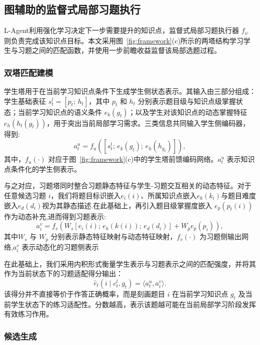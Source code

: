 \documentclass[11pt,a4paper]{article}
\begin{document}
\subsection{图辅助的监督式局部习题执行}
L-Agent利用强化学习决定下一步需要提升的知识点，监督式局部习题执行器 $f_\psi$ 则负责完成该知识点目标。本文采用图~\ref{fig:framework}(c)所示的两塔结构学习学生与习题之间的匹配函数，并使用一步前瞻收益监督该局部选题过程。

\subsubsection{双塔匹配建模}

学生塔用于在当前学习知识点条件下生成学生侧状态表示。其输入由三部分组成：学生基础表征 $s_t^l=[p_t;\,h_t]$，其中 $p_t$ 和 $h_t$ 分别表示题目级与知识点级掌握状态；当前学习知识点的语义条件 $e_k(g_t)$；以及学生对该知识点的动态掌握特征 $e_h(h_t(g_t))$，用于突出当前局部学习需求。三类信息共同输入学生侧编码器，得到:
\begin{equation}
a_t^{u}
=
f_u\!\left([s_t^l;\,e_k(g_t);\,
e_h(h_{g_t})]\right),
\end{equation}
其中，$f_u(\cdot)$ 对应于图~\ref{fig:framework}(c)中的学生塔前馈编码网络。$a_t^u$ 表示知识点条件化的学生侧表示。

与之对应，习题塔同时整合习题静态特征与学生-习题交互相关的动态特征。对于任意候选习题 $i$，我们将题目标识嵌入$e_i(i)$、所属知识点嵌入$e_k(k_i)$与题目难度嵌入$e_d(d_i)$视为其静态描述.在此基础上，再引入题目级掌握度嵌入 $e_p(p_t(i))$ 作为动态补充,进而得到习题表示:
\begin{equation}
a_i^{v}
=
f_v\!\left(
W_s[e_i(i);\,
e_k(k(i));\,
e_d(d_i)]
+
W_p e_p(p_i)
\right),
\end{equation}
其中$W_s$ 与 $W_p$ 分别表示静态特征映射与动态特征映射，$f_v(\cdot)$ 为习题侧输出网络,$a_i^v$ 表示动态化的习题侧表示

在此基础上，我们采用内积形式衡量学生表示与习题表示之间的匹配强度，并将其作为当前状态下的习题适配得分输出：
\begin{equation}
\hat{r}_{t}(i\mid c_t^l,g_t)=\langle a_t^{u},a_i^{v}\rangle.
\end{equation}
该得分并不直接等价于作答正确概率，而是刻画题目 $i$ 在当前学习知识点 $g_t$ 及当前学生状态下的练习适配性。分数越高，表示该题越可能在当前局部学习阶段发挥有效练习作用。
\subsubsection{候选生成}
\end{document}
